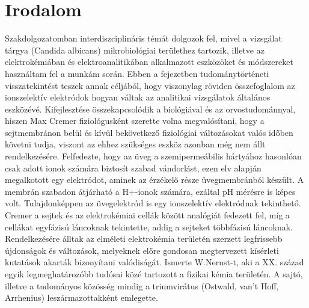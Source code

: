 \chapter{Irodalom}
\pagestyle{headings}

Szakdolgozatomban interdiszciplináris témát dolgozok fel, mivel a vizsgálat tárgya (Candida albicans) mikrobiológiai területhez tartozik, illetve az elektrokémiában és elektroanalitikában alkalmazott eszközöket és módszereket használtam fel a munkám során.
Ebben a fejezetben tudománytörténeti visszatekintést teszek annak céljából, hogy viszonylag röviden összefoglalom az ionszelektív elektródok hogyan váltak az analitikai vizsgálatok általános eszközévé. Kifejlesztése összekapcsolódik a biológiával és az orvostudománnyal, hiszen Max Cremer fiziológusként szerette volna megvalósítani, hogy a sejtmembránon belül és kívül bekövetkező fiziológiai változásokat valós időben követni tudja, viszont az ehhez szükséges eszköz  azonban még nem állt rendelkezésére. Felfedezte, hogy az üveg a szemipermeábilis hártyához hasonlóan csak adott ionok számára biztosít szabad vándorlást, ezen elv alapján megalkotott egy elektródot, aminek az érzékelő része üvegmembránból készült. A membrán szabadon átjárható a H+-ionok számára, ezáltal pH mérésre is képes volt. Tulajdonképpen az üvegelektród is egy ionszelektív elektródnak tekinthető. Cremer a sejtek és az elektrokémiai cellák között analógiát fedezett fel, míg a cellákat egyfázisú láncoknak tekintette, addig a sejteket többfázisú láncoknak. Rendelkezésére álltak az elméleti elektrokémia területén szerzett legfrissebb újdonságok és változások, melyeknek előre gondosan megtervezett kísérleti kutatások akarták bizonyítani valódiságát.
 Ismerte W.Nernst-t, aki a XX. század egyik legmeghatározóbb tudósai közé tartozott a fizikai kémia területén. A sajtó, illetve a tudományos közösség mindig a triumvirátus (Ostwald, van’t Hoff, Arrhenius) leszármazottakként emlegette. 

